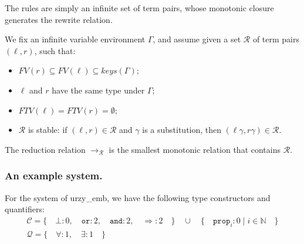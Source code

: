 \documentclass[runningheads,a4paper]{llncs}
\newcommand{\Rules}{\mathcal{R}}
\newcommand{\TypeConstructors}{\mathcal{C}}
\newcommand{\TypeQuantifiers}{\mathcal{Q}}
\newcommand{\arr}[1]{\to_{#1}}
\newcommand{\FTV}{\mathit{FTV}}
\newcommand{\FV}{\mathit{FV}}
\begin{document}
The rules are simply an infinite set of term pairs, whose monotonic
closure generates the rewrite relation.

\begin{definition}
We fix an infinite variable environment $\Gamma$,
and assume given a set $\Rules$ of term pairs $(\ell,r)$, such that:
\begin{itemize}
\item $\FV(r) \subseteq \FV(\ell) \subseteq \mathit{keys}(\Gamma)$;
\item $\ell$ and $r$ have the same type under $\Gamma$;
\item $\FTV(\ell) = \FTV(r) = \emptyset$;
\item $\Rules$ is stable: if $(\ell,r) \in \Rules$ and $\gamma$ is a
  substitution, then $(\ell\gamma,r\gamma) \in \Rules$.
\end{itemize}
The reduction relation $\arr{\Rules}$ is the smallest monotonic
relation that contains $\Rules$.
\end{definition}

\subsubsection{An example system.}

For the system of urzy\_emb, we have the following type constructors
and quantifiers:
\[
\begin{array}{c}
\TypeConstructors = \{\quad
  \bot : 0,\quad
  \mathtt{or} : 2,\quad
  \mathtt{and} : 2,\quad
  \Rightarrow : 2\quad
  \}\quad \cup\quad
  \{\quad \mathtt{prop}_i : 0 \mid i \in \mathbb{N}\quad \} \\
\TypeQuantifiers = \{\quad
  \forall : 1,\quad
  \exists : 1\quad
  \} \\
\end{array}
\]
\end{document}
